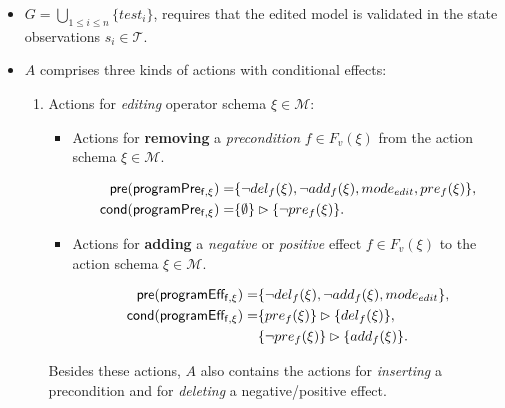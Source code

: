 \documentclass[letterpaper]{article} %
\newcommand{\pre}{\mathsf{pre}}     %
\newcommand{\cond}{\mathsf{cond}}   %
\begin{document}
\begin{itemize}
\item $G=\bigcup_{1\leq i\leq n}\{test_i\}$, requires that the edited model is validated in the state observations $s_i\in\mathcal{T}$.
\item $A$ comprises three kinds of actions with conditional effects:
\begin{enumerate}
\item Actions for {\em editing} operator schema $\xi\in\mathcal{M}$:
\begin{itemize}
\item Actions for {\bf removing} a {\em precondition} $f\in F_v(\xi)$ from the action schema $\xi\in\mathcal{M}$.

\begin{small}
\begin{align*}
\hspace*{7pt}\pre(\mathsf{programPre_{f,\xi}})=&\{\neg del_{f}(\xi),\neg add_{f}(\xi), mode_{edit}, pre_{f}(\xi)\},\\
\cond(\mathsf{programPre_{f,\xi}})=&\{\emptyset\}\rhd\{\neg pre_{f}(\xi)\}.
\end{align*}
\end{small}

\item Actions for {\bf adding} a {\em negative} or {\em positive} effect $f\in F_v(\xi)$ to the action schema $\xi\in\mathcal{M}$.

\begin{small}
\begin{align*}
\hspace*{7pt}\pre(\mathsf{programEff_{f,\xi}})=&\{\neg del_{f}(\xi),\neg add_{f}(\xi), mode_{edit}\},\\
\cond(\mathsf{programEff_{f,\xi}})=&\{pre_{f}(\xi)\}\rhd\{del_{f}(\xi)\},\\
&\{\neg pre_{f}(\xi)\}\rhd\{add_{f}(\xi)\}.
\end{align*}
\end{small}
\end{itemize}
Besides these actions, $A$ also contains the actions for {\em inserting} a precondition and for {\em deleting} a negative/positive effect.



\end{enumerate}
\end{itemize}
\end{document}
